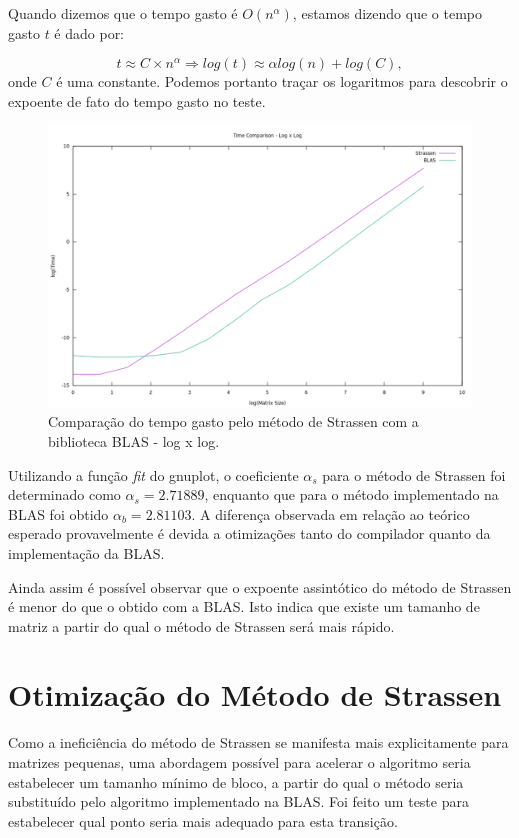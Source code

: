 \documentclass[12pt,a4paper,onecolumn]{article}
\begin{document}
Quando dizemos que o tempo gasto é $O(n^{\alpha})$, estamos dizendo que o tempo gasto $t$ é dado por:

\[
 t \approx C \times n^{\alpha} \Rightarrow log(t) \approx \alpha log(n) + log(C) ,
\]
onde $C$ é uma constante. Podemos portanto traçar os logaritmos para descobrir o expoente de fato do tempo gasto no teste.

\begin{figure}[H]
\centering
\includegraphics[width=1\linewidth]
{./figures/plot_time_no_opt_log.pdf}
\caption{Comparação do tempo gasto pelo método de Strassen com a biblioteca BLAS - log x log.} 
\label{time_test_log}
\end{figure}
 
Utilizando a função \emph{fit} do gnuplot, o coeficiente $\alpha_s$ para o método de Strassen
foi determinado como $\alpha_s = 2.71889$, enquanto que para o método implementado na BLAS foi obtido
$\alpha_b = 2.81103$. A diferença observada em relação ao teórico esperado provavelmente é devida a otimizações tanto do compilador
quanto da implementação da BLAS.

Ainda assim é possível observar que o expoente assintótico do método de Strassen é menor do que o obtido com a BLAS. Isto indica que existe um tamanho de matriz 
a partir do qual o método de Strassen será mais rápido.

\section*{Otimização do Método de Strassen}

Como a ineficiência do método de Strassen se manifesta mais explicitamente para matrizes pequenas, uma abordagem possível para acelerar o algoritmo seria estabelecer um
tamanho mínimo de bloco, a partir do qual o método seria substituído pelo algoritmo implementado na BLAS. Foi feito um teste para estabelecer qual ponto seria mais adequado para esta transição.
\end{document}
